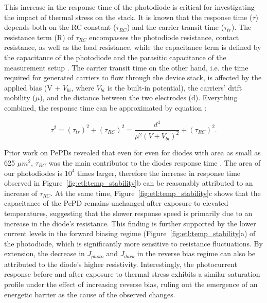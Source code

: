 This increase in the response time of the photodiode is critical for investigating the impact of thermal stress on the stack. It is known that the response time ($\tau$) depends both on the RC constant ($\tau_{RC}$) and the carrier transit time ($\tau_{tr}$). The resistance term (R) of $\tau_{RC}$ encompasses the photodiode resistance, contact resistance, as well as the load resistance, while the capacitance term is defined by the capacitance of the photodiode and the parasitic capacitance of the measurement setup \cite{Shen2016ADetection}. The carrier transit time on the other hand, i.e. the time required for generated carriers to flow through the device stack, is affected by the applied bias (V + $V_{bi}$, where $V_{bi}$ is the built-in potential), the carriers' drift mobility ($\mu$), and the distance between the two electrodes (d). Everything combined, the response time can be approximated by equation \cite{MortezaNajarian2022Sub-millimetrePerovskites}: 

\begin{equation}
    \tau^2 = (\tau_{tr})^2 + (\tau_{RC})^2 = \frac{d^4}{\mu ^2(V + V_{bi})^2} + (\tau_{RC})^2.
\end{equation}

Prior work on PePDs revealed that even for even for diodes with area as small as 625 $\mu m^2$, $\tau_{RC}$ was the main contributor to the diodes response time \cite{Song2024HalideImager}. The area of our photodiodes is $10^4$ times larger, therefore the increase in response time observed in Figure~\ref{fig:etl:temp_stability}b can be reasonably attributed to an increase of $\tau_{RC}$. At the same time, Figure~\ref{fig:etl:temp_stability}c shows that the capacitance of the PePD remains unchanged after exposure to elevated temperatures, suggesting that the slower response speed is primarily due to an increase in the diode's resistance. This finding is further supported by the lower current levels in the forward biasing regime (Figure~\ref{fig:etl:temp_stability}a) of the photodiode, which is significantly more sensitive to resistance fluctuations. By extension, the decrease in $J_{photo}$ and $J_{dark}$ in the reverse bias regime can also be attributed to the diode's higher resistivity. Interestingly, the photocurrent response before and after exposure to thermal stress exhibits a similar saturation profile under the effect of increasing reverse bias, ruling out the emergence of an energetic barrier as the cause of the observed changes.

